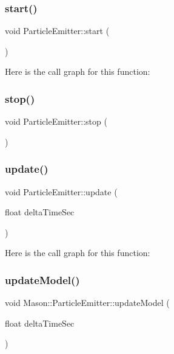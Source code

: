 \subsubsection{\texorpdfstring{start()}{start()}}
{\footnotesize\ttfamily void Particle\+Emitter\+::start (\begin{DoxyParamCaption}{ }\end{DoxyParamCaption})}

Here is the call graph for this function\+:
\hypertarget{class_mason_1_1_particle_emitter_a4843aa3afd1c4d49c9c2519837fffe81}{}\label{class_mason_1_1_particle_emitter_a4843aa3afd1c4d49c9c2519837fffe81} 
\subsubsection{\texorpdfstring{stop()}{stop()}}
{\footnotesize\ttfamily void Particle\+Emitter\+::stop (\begin{DoxyParamCaption}{ }\end{DoxyParamCaption})}

\hypertarget{class_mason_1_1_particle_emitter_a34da56b84fe4810c701f4b1541e079dc}{}\label{class_mason_1_1_particle_emitter_a34da56b84fe4810c701f4b1541e079dc} 
\subsubsection{\texorpdfstring{update()}{update()}}
{\footnotesize\ttfamily void Particle\+Emitter\+::update (\begin{DoxyParamCaption}\item[{float}]{delta\+Time\+Sec }\end{DoxyParamCaption})}

Here is the call graph for this function\+:
\hypertarget{class_mason_1_1_particle_emitter_abc43ce83f1adef05e78b166422217cad}{}\label{class_mason_1_1_particle_emitter_abc43ce83f1adef05e78b166422217cad} 
\subsubsection{\texorpdfstring{update\+Model()}{updateModel()}}
{\footnotesize\ttfamily void Mason\+::\+Particle\+Emitter\+::update\+Model (\begin{DoxyParamCaption}\item[{float}]{delta\+Time\+Sec }\end{DoxyParamCaption})\hspace{0.3cm}{\ttfamily [protected]}}

